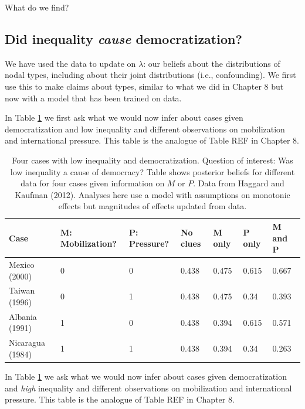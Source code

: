\documentclass[
  12pt,
]{book}
\begin{document}
What do we find?

\hypertarget{did-inequality-cause-democratization}{%
\subsection{\texorpdfstring{Did inequality \emph{cause} democratization?}{Did inequality cause democratization?}}\label{did-inequality-cause-democratization}}

We have used the data to update on \(\lambda\): our beliefs about the distributions of nodal types, including about their joint distributions (i.e., confounding). We first use this to make claims about types, similar to what we did in Chapter 8 but now with a model that has been trained on data.

In Table \ref{tab:HK10cases1} we first ask what we would now infer about cases given democratization and low inequality and different observations on mobilization and international pressure. This table is the analogue of Table REF in Chapter 8.

\begin{table}

\caption{\label{tab:HK10cases1}Four cases with low inequality and  democratization. Question of interest: Was low inequality a cause of democracy? Table shows posterior beliefs for different data for four cases given information on $M$ or $P$. Data from Haggard and Kaufman (2012). Analyses here use a model with assumptions on monotonic effects but magnitudes of effects updated from data.}
\centering
\begin{tabular}[t]{l|l|l|l|l|l|l}
\hline
Case & M: Mobilization? & P: Pressure? & No clues & M only & P only & M and P\\
\hline
Mexico (2000) & 0 & 0 & 0.438 & 0.475 & 0.615 & 0.667\\
\hline
Taiwan (1996) & 0 & 1 & 0.438 & 0.475 & 0.34 & 0.393\\
\hline
Albania (1991) & 1 & 0 & 0.438 & 0.394 & 0.615 & 0.571\\
\hline
Nicaragua (1984) & 1 & 1 & 0.438 & 0.394 & 0.34 & 0.263\\
\hline
\end{tabular}
\end{table}

In Table \ref{tab:HK10cases1} we ask what we would now infer about cases given democratization and \emph{high} inequality and different observations on mobilization and international pressure. This table is the analogue of Table REF in Chapter 8.
\end{document}
